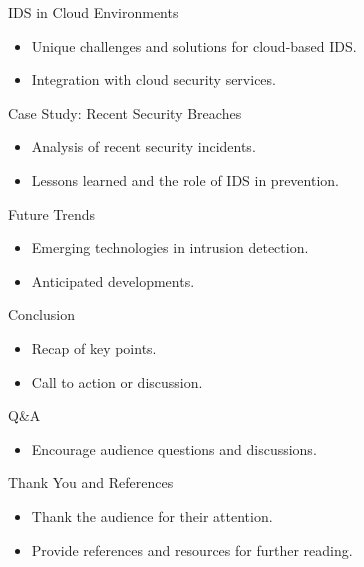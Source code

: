 \documentclass{beamer}
\begin{document}
\begin{frame}{IDS in Cloud Environments}
    \begin{itemize}
        \item Unique challenges and solutions for cloud-based IDS.
        \item Integration with cloud security services.
    \end{itemize}
\end{frame}


\begin{frame}{Case Study: Recent Security Breaches}
    \begin{itemize}
        \item Analysis of recent security incidents.
        \item Lessons learned and the role of IDS in prevention.
    \end{itemize}
\end{frame}


\begin{frame}{Future Trends}
    \begin{itemize}
        \item Emerging technologies in intrusion detection.
        \item Anticipated developments.
    \end{itemize}
\end{frame}


\begin{frame}{Conclusion}
    \begin{itemize}
        \item Recap of key points.
        \item Call to action or discussion.
    \end{itemize}
\end{frame}


\begin{frame}{Q\&A}
    \begin{itemize}
        \item Encourage audience questions and discussions.
    \end{itemize}
\end{frame}


\begin{frame}{Thank You and References}
    \begin{itemize}
        \item Thank the audience for their attention.
        \item Provide references and resources for further reading.
    \end{itemize}
\end{frame}
\end{document}
